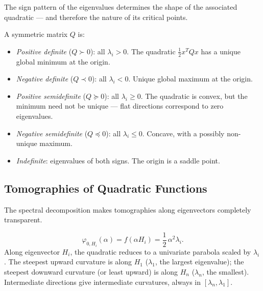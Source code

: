 The sign pattern of the eigenvalues determines the shape of the associated quadratic --- and therefore the nature of its critical points.

\begin{defn}\label{def:definiteness}
	A symmetric matrix $Q$ is:
	\begin{itemize}
		\item \textit{Positive definite} ($Q \succ 0$): all $\lambda_i > 0$.
			The quadratic $\frac{1}{2} x^T Q x$ has a unique global minimum at the origin.
		\item \textit{Negative definite} ($Q \prec 0$): all $\lambda_i < 0$.
			Unique global maximum at the origin.
		\item \textit{Positive semidefinite} ($Q \succeq 0$): all $\lambda_i \geq 0$.
			The quadratic is convex, but the minimum need not be unique --- flat directions correspond to zero eigenvalues.
		\item \textit{Negative semidefinite} ($Q \preceq 0$): all $\lambda_i \leq 0$.
			Concave, with a possibly non-unique maximum.
		\item \textit{Indefinite}: eigenvalues of both signs.
			The origin is a saddle point.
	\end{itemize}
\end{defn}


\subsection{Tomographies of Quadratic Functions}\label{ssec:quad-tomographies}

The spectral decomposition makes tomographies along eigenvectors completely transparent.

\begin{equation}\label{eq:tomography-eigenvector}
	\varphi_{0, H_i}(\alpha) = f(\alpha H_i) = \frac{1}{2}\, \alpha^2 \lambda_i.
\end{equation}
Along eigenvector $H_i$, the quadratic reduces to a univariate parabola scaled by $\lambda_i$.
The steepest upward curvature is along $H_1$ ($\lambda_1$, the largest eigenvalue); the steepest downward curvature (or least upward) is along $H_n$ ($\lambda_n$, the smallest).
Intermediate directions give intermediate curvatures, always in $[\lambda_n,\lambda_1]$.

